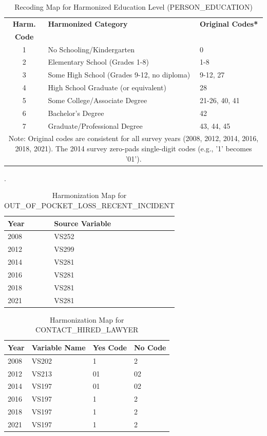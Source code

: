 \begin{table}[ht]
\centering
\caption{Recoding Map for Harmonized Education Level (PERSON\_EDUCATION)}
\label{tab:education_recoding}
\begin{tabular}{cll}
\toprule
\textbf{Harm.} & \textbf{Harmonized Category} & \textbf{Original Codes*} \\
\textbf{Code} & & \\
\midrule
1 & No Schooling/Kindergarten                 & 0 \\
2 & Elementary School (Grades 1-8)            & 1-8 \\
3 & Some High School (Grades 9-12, no diploma) & 9-12, 27 \\
4 & High School Graduate (or equivalent)      & 28 \\
5 & Some College/Associate Degree             & 21-26, 40, 41 \\
6 & Bachelor's Degree                         & 42 \\
7 & Graduate/Professional Degree              & 43, 44, 45 \\
\bottomrule
\multicolumn{3}{p{0.8\textwidth}}{\footnotesize *Note: Original codes are consistent for all survey years (2008, 2012, 2014, 2016, 2018, 2021). The 2014 survey zero-pads single-digit codes (e.g., '1' becomes '01').} \\
\end{tabular}
\end{table}

\begin{table}[ht]
\centering
\caption{Harmonization Map for OUT\_OF\_POCKET\_LOSS\_RECENT\_INCIDENT}.
\label{tab:map_oop_loss}
\begin{tabular}{ll}
\toprule
\textbf{Year} & \textbf{Source Variable} \\
\midrule
2008 & VS252 \\
2012 & VS299 \\
2014 & VS281 \\
2016 & VS281 \\
2018 & VS281 \\
2021 & VS281 \\
\bottomrule
\end{tabular}
\end{table}

\begin{table}[ht]
\centering
\caption{Harmonization Map for CONTACT\_HIRED\_LAWYER}
\label{tab:map_hired_lawyer}
\begin{tabular}{llll}
\toprule
\textbf{Year} & \textbf{Variable Name} & \textbf{Yes Code} & \textbf{No Code} \\
\midrule
2008 & VS202 & 1  & 2  \\
2012 & VS213 & 01 & 02 \\
2014 & VS197 & 01 & 02 \\
2016 & VS197 & 1  & 2  \\
2018 & VS197 & 1  & 2  \\
2021 & VS197 & 1  & 2  \\
\bottomrule
\end{tabular}
\end{table}

